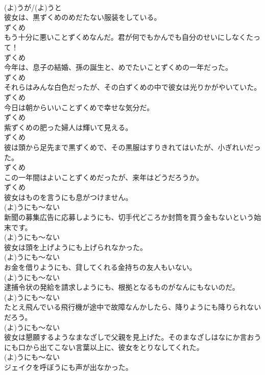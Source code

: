 \documentclass[8pt]{extreport}
\begin{document}
\begin{CJK}{UTF8}{min}
\\	(よ)うが/(よ)うと	
\\	彼女は、黒ずくめのめだたない服装をしている。	
\\	ずくめ	
\\	もう十分に悪いことずくめなんだ。君が何でもかんでも自分のせいにしなくたって！	
\\	ずくめ	
\\	今年は、息子の結婚、孫の誕生と、めでたいことずくめの一年だった。	
\\	ずくめ	
\\	それらはみんな白色だったが、その白ずくめの中で彼女は光りかがやいていた。	
\\	ずくめ	
\\	今日は朝からいいことずくめで幸せな気分だ。	
\\	ずくめ	
\\	紫ずくめの肥った婦人は輝いて見える。	
\\	ずくめ	
\\	彼は頭から足先まで黒ずくめで、その黒服はすりきれてはいたが、小ぎれいだった。	
\\	ずくめ	
\\	この一年間はよいことずくめだったが、来年はどうだろうか。	
\\	ずくめ	
\\	彼女はものを言うにも息がつけません。	
\\	(よ)うにも～ない	
\\	新聞の募集広告に応募しようにも、切手代どころか封筒を買う金もないという始末です。	
\\	(よ)うにも～ない	
\\	彼女は頭を上げようにも上げられなかった。	
\\	(よ)うにも～ない	
\\	お金を借りようにも、貸してくれる金持ちの友人もいない。	
\\	(よ)うにも～ない	
\\	逮捕令状の発給を請求しようにも、根拠となるものがなんにもないのだ。	
\\	(よ)うにも～ない	
\\	たとえ飛んでいる飛行機が途中で故障なんかしたら、降りようにも降りられないだろう。	
\\	(よ)うにも～ない	
\\	彼女は懇願するようなまなざしで父親を見上げた。そのまなざしはなにか言おうにも口から出てこない言葉以上に、彼女をとりなしてくれた。	
\\	(よ)うにも～ない	
\\	ジェイクを呼ぼうにも声が出なかった。	

\end{CJK}
\end{document}
